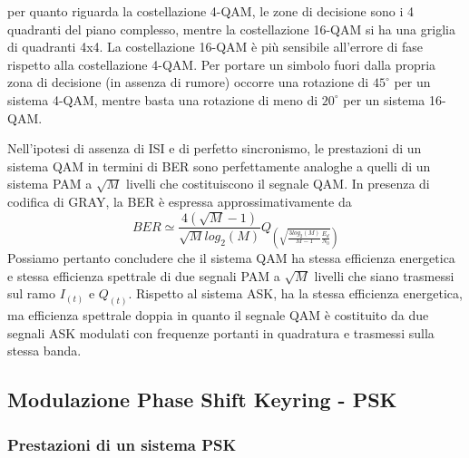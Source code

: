         \begin{figure}[H]
            \centering
            \hfill
        \end{figure}
        per quanto riguarda la costellazione 4-QAM, le zone di decisione sono i 4 quadranti del piano complesso, mentre
        la costellazione 16-QAM si ha una griglia di quadranti 4x4. La costellazione 16-QAM è più sensibile all'errore 
        di fase rispetto alla costellazione 4-QAM. Per portare un simbolo fuori dalla propria zona di decisione 
        (in assenza di rumore) occorre una rotazione di $45^\circ$ per un sistema 4-QAM, mentre basta una rotazione di 
        meno di $20^\circ$ per un sistema 16-QAM.

        Nell'ipotesi di assenza di ISI e di perfetto sincronismo, le prestazioni di un sistema QAM in termini di BER 
        sono perfettamente analoghe a quelli di un sistema PAM a $\sqrt{M}$ livelli che costituiscono il segnale QAM.
        In presenza di codifica di GRAY, la BER è espressa approssimativamente da 
        \[
            BER \simeq \frac{4(\sqrt{M}-1)}{\sqrt{M}log_2(M)}Q_{\displaystyle \left(\sqrt{\frac{3log_2(M)}{M-1}\frac{E_d}{N_0}}\right)}  
        \]
        Possiamo pertanto concludere che il sistema QAM ha stessa efficienza energetica e stessa efficienza spettrale di due segnali PAM
        a $\sqrt{M}$ livelli che siano trasmessi sul ramo $I_{(t)}$ e $Q_{(t)}$. Rispetto al sistema ASK, ha la stessa efficienza energetica,
        ma efficienza spettrale doppia in quanto il segnale QAM è costituito da due segnali ASK modulati con frequenze portanti in 
        quadratura e trasmessi sulla stessa banda.

    \subsection{Modulazione Phase Shift Keyring - PSK}

        \subsubsection{Prestazioni di un sistema PSK}
    
